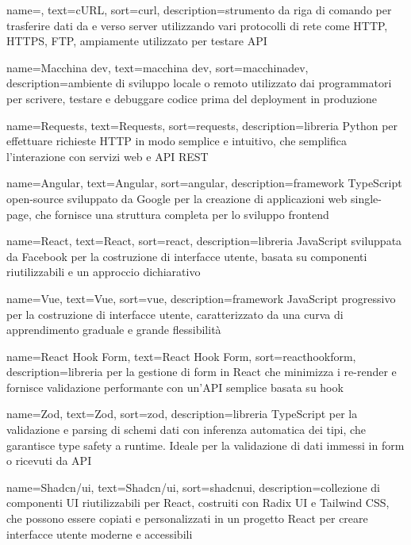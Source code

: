  {
    name=,
    text=cURL,
    sort=curl,
    description={strumento da riga di comando per trasferire dati da e verso server utilizzando vari protocolli di rete come HTTP, HTTPS, FTP, ampiamente utilizzato per testare API}
}

 {
    name=Macchina dev,
    text=macchina dev,
    sort=macchinadev,
    description={ambiente di sviluppo locale o remoto utilizzato dai programmatori per scrivere, testare e debuggare codice prima del deployment in produzione}
}

 {
    name=Requests,
    text=Requests,
    sort=requests,
    description={libreria Python per effettuare richieste HTTP in modo semplice e intuitivo, che semplifica l'interazione con servizi web e API REST}
}

 {
    name=Angular,
    text=Angular,
    sort=angular,
    description={framework TypeScript open-source sviluppato da Google per la creazione di applicazioni web single-page, che fornisce una struttura completa per lo sviluppo frontend}
}

 {
    name=React,
    text=React,
    sort=react,
    description={libreria JavaScript sviluppata da Facebook per la costruzione di interfacce utente, basata su componenti riutilizzabili e un approccio dichiarativo}
}

 {
    name=Vue,
    text=Vue,
    sort=vue,
    description={framework JavaScript progressivo per la costruzione di interfacce utente, caratterizzato da una curva di apprendimento graduale e grande flessibilità}
}

 {
    name=React Hook Form,
    text=React Hook Form,
    sort=reacthookform,
    description={libreria per la gestione di form in React che minimizza i re-render e fornisce validazione performante con un'API semplice basata su hook}
}

 {
    name=Zod,
    text=Zod,
    sort=zod,
    description={libreria TypeScript per la validazione e parsing di schemi dati con inferenza automatica dei tipi, che garantisce type safety a runtime. Ideale per la validazione di dati immessi in form o ricevuti da API}
}

 {
    name=Shadcn/ui,
    text=Shadcn/ui,
    sort=shadcnui,
    description={collezione di componenti UI riutilizzabili per React, costruiti con Radix UI e Tailwind CSS, che possono essere copiati e personalizzati in un progetto React per creare interfacce utente moderne e accessibili}
}

